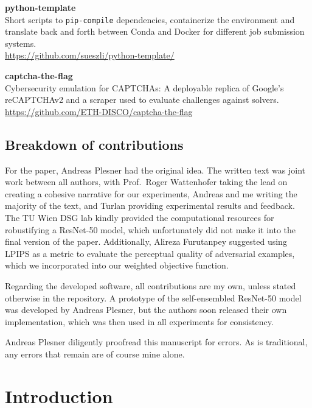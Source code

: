 \documentclass[a4paper, oneside]{discothesis}
\newcommand{\linebreaks}{\vspace*{0.5em}}
\begin{document}
\linebreaks

\textbf{python-template} \\
Short scripts to \texttt{pip-compile} dependencies, containerize the environment and translate back and forth between Conda and Docker for different job submission systems. \\
\url{https://github.com/sueszli/python-template/}

\linebreaks

\textbf{captcha-the-flag} \\
Cybersecurity emulation for CAPTCHAs: A deployable replica of Google's reCAPTCHAv2 and a scraper used to evaluate challenges against solvers. \\
\url{https://github.com/ETH-DISCO/captcha-the-flag}

\section*{Breakdown of contributions}

For the paper, Andreas Plesner had the original idea. The written text was joint work between all authors, with Prof.\ Roger Wattenhofer taking the lead on creating a cohesive narrative for our experiments, Andreas and me writing the majority of the text, and Turlan providing experimental results and feedback. The TU Wien DSG lab kindly provided the computational resources for robustifying a ResNet-50 model, which unfortunately did not make it into the final version of the paper. Additionally, Alireza Furutanpey suggested using LPIPS as a metric to evaluate the perceptual quality of adversarial examples, which we incorporated into our weighted objective function.

Regarding the developed software, all contributions are my own, unless stated otherwise in the repository. A prototype of the self-ensembled ResNet-50 model was developed by Andreas Plesner, but the authors soon released their own implementation, which was then used in all experiments for consistency.

Andreas Plesner diligently proofread this manuscript for errors. As is traditional, any errors that remain are of course mine alone.

\tableofcontents

\mainmatter

\chapter{Introduction}
\end{document}
